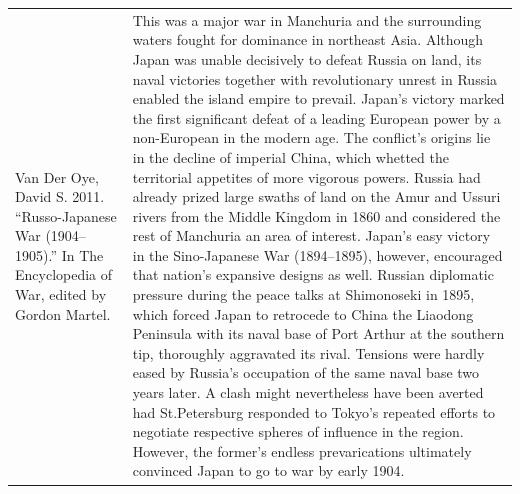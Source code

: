 {\begin{longtable}{p{}p{}}
Van Der Oye, David S. 2011. “Russo-Japanese War (1904–1905).” In The Encyclopedia of War, edited by Gordon Martel. & This was a major war in Manchuria and the surrounding waters fought for dominance in northeast Asia. Although Japan was unable decisively to defeat Russia on land, its naval victories together with revolutionary unrest in Russia enabled the island empire to prevail. Japan's victory marked the first significant defeat of a leading European power by a non-European in the modern age. The conflict's origins lie in the decline of imperial China, which whetted the territorial appetites of more vigorous powers. Russia had already prized large swaths of land on the Amur and Ussuri rivers from the Middle Kingdom in 1860 and considered the rest of Manchuria an area of interest. Japan's easy victory in the Sino-Japanese War (1894–1895), however, encouraged that nation's expansive designs as well.  Russian diplomatic pressure during the peace talks at Shimonoseki in 1895, which forced Japan to retrocede to China the Liaodong Peninsula with its naval base of Port Arthur at the southern tip, thoroughly aggravated its rival. Tensions were hardly eased by Russia's occupation of the same naval base two years later. A clash might nevertheless have been averted had St.Petersburg responded to Tokyo's repeated efforts to negotiate respective spheres of influence in the region. However, the former's endless prevarications ultimately convinced Japan to go to war by early 1904.
\\

\end{longtable}}
